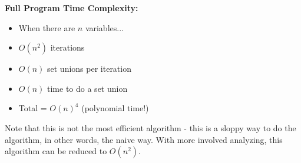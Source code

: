 \documentclass[10pt]{article}
\begin{document}
\textbf{Full Program Time Complexity:}
\begin{itemize}
    \item When there are $n$ variables...
    \item $O(n^2)$ iterations
    \item $O(n)$ set unions per iteration
    \item $O(n)$ time to do a set union
    \item Total = $O(n)^4$ (polynomial time!)
\end{itemize}
Note that this is not the most efficient algorithm - this is a sloppy way to do the algorithm, in other words, the naive way.  With more involved analyzing, this algorithm can be reduced to $O(n^2)$.
\end{document}
